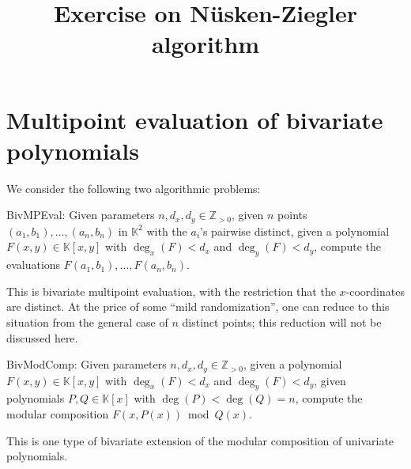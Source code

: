 \documentclass[11pt,a4paper,reqno]{amsart}
\title{Exercise on N\"usken-Ziegler algorithm}
\newcommand{\field}{\mathbb{K}} %
\newcommand{\pring}{\field[x]} %
\newcommand{\ZZp}{\mathbb{Z}_{>0}} %
\begin{document}
\maketitle

\thispagestyle{fancy}

\section{Multipoint evaluation of bivariate polynomials}

We consider the following two algorithmic problems:

\smallskip
%
\textsf{BivMPEval}: Given parameters \(n,d_x,d_y \in \ZZp\), given \(n\) points
$(a_1,b_1),\ldots,(a_n,b_n)$ in \(\field^2\) with the \(a_i\)'s pairwise
distinct, given a polynomial \(F(x,y) \in \field[x,y]\) with \(\deg_x(F) <
d_x\) and \(\deg_y(F) < d_y\), compute the evaluations
\(F(a_1,b_1),\ldots,F(a_n,b_n)\).

\smallskip

This is bivariate multipoint evaluation, with the restriction that the
\(x\)-coordinates are distinct. At the price of some ``mild randomization'',
one can reduce to this situation from the general case of \(n\) distinct
points; this reduction will not be discussed here.

\smallskip
%
\textsf{BivModComp}: Given parameters \(n,d_x,d_y \in \ZZp\), given a
polynomial \(F(x,y) \in \field[x,y]\) with \(\deg_x(F) < d_x\) and \(\deg_y(F)
< d_y\), given polynomials \(P,Q \in \pring\) with \(\deg(P) < \deg(Q) = n\),
compute the modular composition \(F(x,P(x)) \bmod Q(x)\).

\smallskip

This is one type of bivariate extension of the modular composition of
univariate polynomials.
\end{document}

